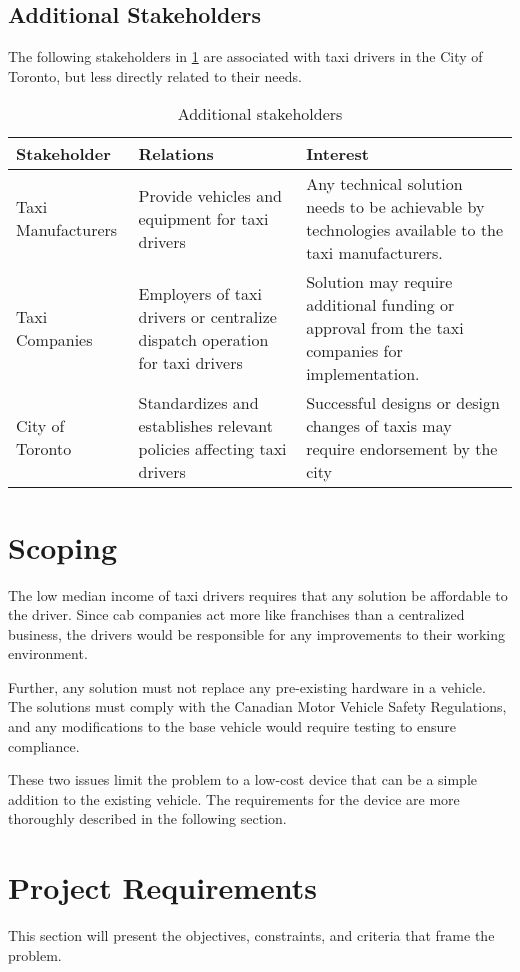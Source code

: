 \documentclass[11pt]{article}
\begin{document}
\subsection{Additional Stakeholders}

The following stakeholders in \ref{tab:stakeholders} are associated with taxi drivers in the City 
of Toronto, but less directly related to their needs. 

\begin{table}[h]
  \centering
  \caption{Additional stakeholders}
  \label{tab:stakeholders}
    \begin{tabular}{ l p{5cm} p{5cm}}
    Stakeholder & Relations &	Interest \\ \hline
    Taxi Manufacturers & Provide vehicles and equipment for taxi drivers	& 
    Any technical solution needs to be achievable by technologies available 
    to the taxi manufacturers. \\ 
    Taxi Companies & Employers of taxi drivers or centralize dispatch 
    operation for taxi drivers	& Solution may require additional funding 
    or approval from the taxi companies for implementation. \\
    City of Toronto & Standardizes and establishes relevant policies 
    affecting taxi drivers \cite{CityofToronto}	& Successful designs or design changes of  
    taxis may require endorsement by the city  \\
    \end{tabular}
\end{table}
\clearpage
\section{Scoping}
The low median income of taxi drivers\cite{iTaxiWorkers2012} requires
that any solution be affordable to the driver. Since cab companies act
more like franchises than a centralized business, the drivers would be
responsible for any improvements to their working environment. 

Further, any solution must not replace any pre-existing hardware in a
vehicle. The solutions must comply with the Canadian Motor Vehicle
Safety Regulations\cite{motorregs}, and any modifications to the base
vehicle would require testing to ensure compliance. 

These two issues limit the problem to a low-cost device that can be a
simple addition to the existing vehicle. The requirements for the
device are more thoroughly described in the following section.
\section{Project Requirements}
\label{sec:requirements}
This section will present the objectives, constraints, and criteria 
that frame the problem.
\end{document}

